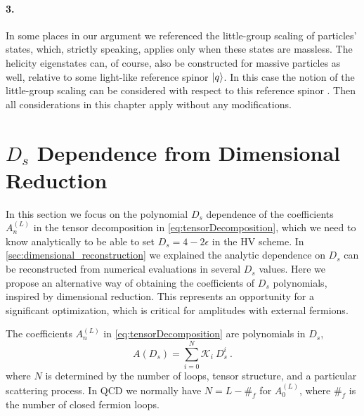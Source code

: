 \paragraph{3.}
In some places in our argument we referenced the little-group scaling 
of particles' states, which, strictly speaking, applies only when these states
are massless.
The helicity eigenstates can, of course, also be constructed for
massive particles as well, relative to some light-like reference spinor $\ket{q}$.
In this case the notion of the little-group scaling can be considered with respect
to this reference spinor \cite{Cohen:2010mi}.
Then all considerations in this chapter apply without any modifications.

 

\section{\texorpdfstring{$D_s$}{Ds} Dependence from Dimensional Reduction}
\label{sec:ds_reduction}

In this section we focus on the polynomial $D_s$ dependence of 
the coefficients $A^{(L)}_n$ in the tensor decomposition in \cref{eq:tensorDecomposition},
which we need to know analytically to be able to set $D_s=4-2\epsilon$ in the HV scheme.
In \cref{sec:dimensional_reconstruction} we explained the analytic dependence on $D_s$ 
can be reconstructed from numerical evaluations in several $D_s$ values.
Here we propose an alternative way of obtaining the coefficients of $D_s$ polynomials, 
inspired by dimensional reduction.
This represents an opportunity for a significant optimization, 
which is critical for amplitudes with external fermions.

The coefficients $A^{(L)}_n$ in \cref{eq:tensorDecomposition} are polynomials in $D_s$,
\begin{equation}
  A(D_s) = \sum_{i=0}^{N} \mathcal{K}_i~D_s^{i}\ .
  \label{eq:ds-poly}
\end{equation}
where $N$ is determined by the number of loops, tensor structure,
and a particular scattering process. 
In QCD we normally have $N=L - \#_f$ for $A^{(L)}_0$, 
where $\#_f$ is the number of closed fermion loops.

